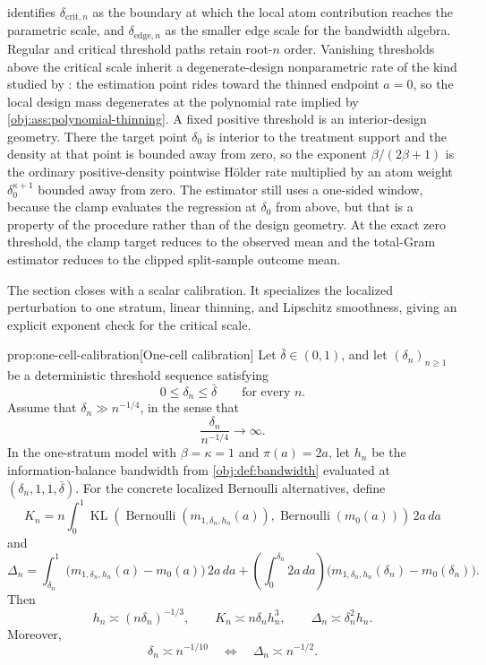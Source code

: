 \documentclass[11pt]{article}
\begin{document}
 identifies \(\delta_{\mathrm{crit},n}\) as the boundary at which the local atom contribution reaches the parametric scale, and \(\delta_{\mathrm{edge},n}\) as the smaller edge scale for the bandwidth algebra. Regular and critical threshold paths retain root-\(n\) order. Vanishing thresholds above the critical scale inherit a degenerate-design nonparametric rate of the kind studied by \citet{Gaiffas2005DegenerateDesign}: the estimation point rides toward the thinned endpoint \(a=0\), so the local design mass degenerates at the polynomial rate implied by \cref{obj:ass:polynomial-thinning}. A fixed positive threshold is an interior-design geometry. There the target point \(\delta_0\) is interior to the treatment support and the density at that point is bounded away from zero, so the exponent \(\beta/(2\beta+1)\) is the ordinary positive-density pointwise Hölder rate \citep{Stone1982,Donoho1991} multiplied by an atom weight \(\delta_0^{\kappa+1}\) bounded away from zero. The estimator still uses a one-sided window, because the clamp evaluates the regression at \(\delta_0\) from above, but that is a property of the procedure rather than of the design geometry. At the exact zero threshold, the clamp target reduces to the observed mean and the total-Gram estimator reduces to the clipped split-sample outcome mean.

The section closes with a scalar calibration. It specializes the localized perturbation to one stratum, linear thinning, and Lipschitz smoothness, giving an explicit exponent check for the critical scale.

\begin{propositionv}{prop:one-cell-calibration}[One-cell calibration]
Let \(\bar\delta\in(0,1)\), and let \((\delta_n)_{n\geq1}\) be a deterministic threshold sequence satisfying
\[
0\leq \delta_n\leq \bar\delta
\qquad\text{for every }n .
\]
Assume that \(\delta_n\gg n^{-1/4}\), in the sense that
\[
\frac{\delta_n}{n^{-1/4}}\longrightarrow\infty .
\]
In the one-stratum model with \(\beta=\kappa=1\) and \(\pi(a)=2a\), let \(h_n\) be the information-balance bandwidth from \cref{obj:def:bandwidth} evaluated at \((\delta_n,1,1,\bar\delta)\). For the concrete localized Bernoulli alternatives, define
\[
K_n
=
n\int_0^1
\operatorname{KL}\!\left(
\operatorname{Bernoulli}(m_{1,\delta_n,h_n}(a)),
\operatorname{Bernoulli}(m_0(a))
\right)\,2a\,da
\]
and
\[
\Delta_n
=
\int_{\delta_n}^1
\bigl(m_{1,\delta_n,h_n}(a)-m_0(a)\bigr)\,2a\,da
+
\left(\int_0^{\delta_n}2a\,da\right)
\bigl(m_{1,\delta_n,h_n}(\delta_n)-m_0(\delta_n)\bigr).
\]
Then
\[
h_n\asymp (n\delta_n)^{-1/3},
\qquad
K_n\asymp n\delta_n h_n^3,
\qquad
\Delta_n\asymp \delta_n^2h_n.
\]
Moreover,
\[
\delta_n\asymp n^{-1/10}
\quad\Longleftrightarrow\quad
\Delta_n\asymp n^{-1/2}.
\]
\end{propositionv}
\end{document}
